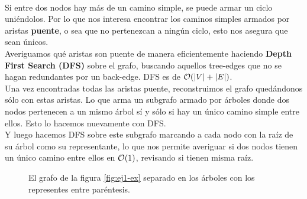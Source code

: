 \documentclass[../main.tex]{subfiles}
\begin{document}
\paragraph{} Si entre dos nodos hay más de un camino simple, se puede armar un ciclo uniéndolos. Por lo que nos interesa encontrar los caminos simples armados por aristas \textbf{puente}, o sea que no pertenezcan a ningún ciclo, esto nos asegura que sean únicos. \\
Averiguamos qué aristas son puente de manera eficientemente haciendo \textbf{Depth First Search (DFS)} sobre el grafo, buscando aquellos tree-edges que no se hagan redundantes por un back-edge. DFS es de \(\mathcal{O}(|V| + |E|)\). \\
Una vez encontradas todas las aristas puente, reconstruimos el grafo quedándonos sólo con estas aristas. Lo que arma un subgrafo armado por árboles donde dos nodos pertenecen a un mismo árbol sí y sólo si hay un único camino simple entre ellos. Esto lo hacemos nuevamente con DFS. \\
Y luego hacemos DFS sobre este subgrafo marcando a cada nodo con la raíz de su árbol como su representante, lo que nos permite averiguar si dos nodos tienen un único camino entre ellos en \(\mathcal{O}(1)\), revisando si tienen misma raíz.

\begin{figure}[H]
\centering

  
\caption{El grafo de la figura \ref{fig:ej1-ex} separado en los árboles con los representes entre paréntesis.}
\label{fig:ej1-res}
\end{figure}
\end{document}
